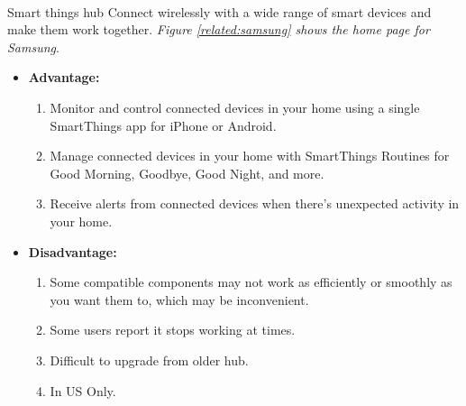 \documentclass[12pt, oneside, a4paper]{book}
\newcommand\boldcolor[1]{\textcolor{bold}{\textbf{#1}}}
\begin{document}
		\paragraph{}Smart things hub Connect wirelessly with a wide range of smart devices and make them work together\cite{samsung}. \textit{Figure \ref{related:samsung} shows the home page for Samsung}.
		\begin{itemize}
			\item \boldcolor{Advantage:}
			\begin{enumerate}
				\item Monitor and control connected devices in your home using a single SmartThings app for iPhone or Android.
				\item Manage connected devices in your home with SmartThings Routines for Good Morning, Goodbye, Good Night, and more.
				\item Receive alerts from connected devices when there’s unexpected activity in your home.
				
			\end{enumerate}
			\item \boldcolor{Disadvantage:} 
			\begin{enumerate}
				\item Some compatible components may not work as efficiently or smoothly as you want them to, which may be inconvenient.
				\item Some users report it stops working at times.
				\item Difficult to upgrade from older hub.
				\item In US Only.
			\end{enumerate}
		\end{itemize}
\end{document}
